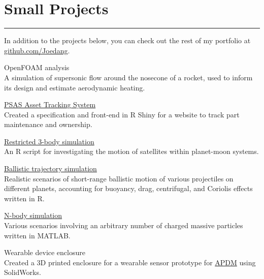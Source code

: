 \section{Small Projects}
\noindent\rule{\textwidth}{\hlinewidth}
In addition to the projects below, you can check out the rest of my portfolio at \href{https://github.com/Joedang}{github.com/Joedang}.
	\begin{innerlist}
	\item OpenFOAM analysis\\
	A simulation of supersonic flow around the nosecone of a rocket, used to inform its design and estimate aerodynamic heating.
	\item \href{https://github.com/joedang/pats}{PSAS Asset Tracking System} \\
	Created a specification and front-end in R Shiny for a website to track part maintenance and ownership.
	\item \href{https://github.com/Joedang/restricted\_three\_body\_problem}{Restricted 3-body simulation} \\
	An R script for investigating the motion of satellites within planet-moon systems. 
	\item \href{https://github.com/Joedang/Portfolio/tree/master/projectile}{Ballistic trajectory simulation} \\
	Realistic scenarios of short-range ballistic motion of various projectiles on different planets, accounting for buoyancy, drag, centrifugal, and Coriolis effects written in R.
	\item \href{https://github.com/Joedang/Portfolio/tree/master/MATLAB\_orbits}{N-body simulation} \\
	Various scenarios involving an arbitrary number of charged massive particles written in MATLAB.
	\item Wearable device enclosure \\
	Created a 3D printed enclosure for a wearable sensor prototype for \href{https://www.apdm.com/}{APDM} using SolidWorks.
	\end{innerlist}
\vfill
